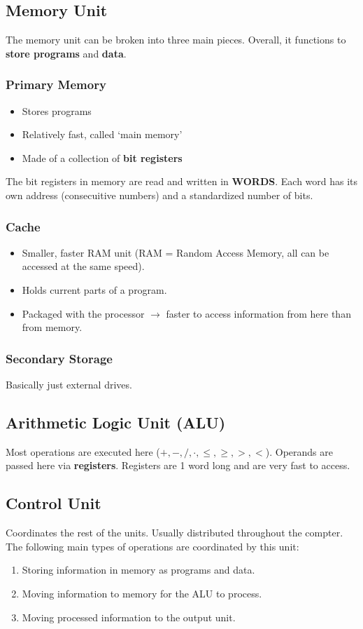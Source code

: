 \documentclass[a4paper,12pt]{report}
\begin{document}
\subsection{Memory Unit}
The memory unit can be broken into three main pieces. Overall, it functions to \textbf{store programs} and \textbf{data}. 
\subsubsection{Primary Memory}
\begin{itemize}
\item Stores programs
\item Relatively fast, called `main memory'
\item Made of a collection of \textbf{bit registers}
\end{itemize}
The bit registers in memory are read and written in \textbf{WORDS}. Each word has its own address (consecuitive numbers) and a standardized number 
of bits. 

\subsubsection{Cache}
\begin{itemize}
\item Smaller, faster RAM unit (RAM = Random Access Memory, all can be accessed at the same speed).
\item Holds current parts of a program.
\item Packaged with the processor $\to$ faster to access information from here than from memory.
\end{itemize}

\subsubsection{Secondary Storage}
Basically just external drives.

\subsection{Arithmetic Logic Unit (ALU)}
Most operations are executed here ($+, -, /, \cdot, \leq, \geq, >, <$). Operands are passed here via \textbf{registers}. Registers are 
1 word long and are very fast to access.

\subsection{Control Unit}
Coordinates the rest of the units. Usually distributed throughout the compter. The following main types of operations are coordinated by this unit:
\begin{enumerate}
\item Storing information in memory as programs and data.
\item Moving information to memory for the ALU to process.
\item Moving processed information to the output unit.
\end{enumerate}
\end{document}
